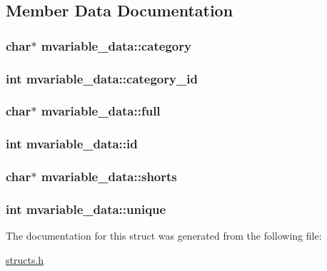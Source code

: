\subsection{Member Data Documentation}
\hypertarget{structmvariable__data_a005d2774ed9a33d1f2be5b628a0a612c}{
\subsubsection[{category}]{\setlength{\rightskip}{0pt plus 5cm}char$\ast$ mvariable\-\_\-data\-::category}}\label{structmvariable__data_a005d2774ed9a33d1f2be5b628a0a612c}
\hypertarget{structmvariable__data_ab447ff2cc2c667f5c406ac4b2404986c}{
\subsubsection[{category\-\_\-id}]{\setlength{\rightskip}{0pt plus 5cm}int mvariable\-\_\-data\-::category\-\_\-id}}\label{structmvariable__data_ab447ff2cc2c667f5c406ac4b2404986c}
\hypertarget{structmvariable__data_ae4dd988bed14131ebe7e5b3724e0a535}{
\subsubsection[{full}]{\setlength{\rightskip}{0pt plus 5cm}char$\ast$ mvariable\-\_\-data\-::full}}\label{structmvariable__data_ae4dd988bed14131ebe7e5b3724e0a535}
\hypertarget{structmvariable__data_ae547d95e0661c808ce69879439316889}{
\subsubsection[{id}]{\setlength{\rightskip}{0pt plus 5cm}int mvariable\-\_\-data\-::id}}\label{structmvariable__data_ae547d95e0661c808ce69879439316889}
\hypertarget{structmvariable__data_a3bc64a49fa59032dd40216c8ece63c12}{
\subsubsection[{shorts}]{\setlength{\rightskip}{0pt plus 5cm}char$\ast$ mvariable\-\_\-data\-::shorts}}\label{structmvariable__data_a3bc64a49fa59032dd40216c8ece63c12}
\hypertarget{structmvariable__data_a1cd531a14e5edfc9c8e774e2b5029c0f}{
\subsubsection[{unique}]{\setlength{\rightskip}{0pt plus 5cm}int mvariable\-\_\-data\-::unique}}\label{structmvariable__data_a1cd531a14e5edfc9c8e774e2b5029c0f}


The documentation for this struct was generated from the following file\-:\begin{DoxyCompactItemize}
\item 
\hyperlink{structs_8h}{structs.\-h}\end{DoxyCompactItemize}
